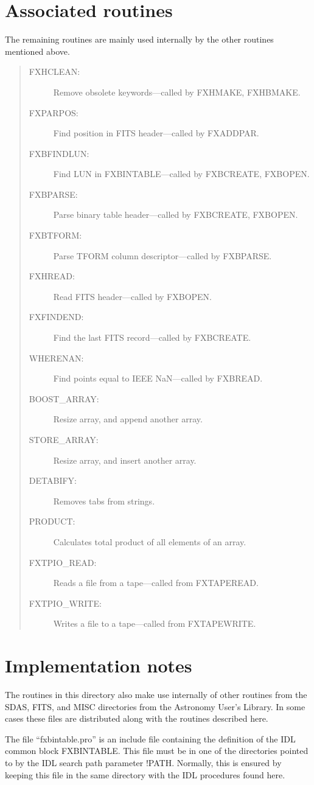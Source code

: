 \section{Associated routines}

The remaining routines are mainly used internally by the other routines
mentioned above.
\begin{quote}
\begin{description}
\item[FXHCLEAN:]
Remove obsolete keywords---called by FXHMAKE, FXHBMAKE.
\item[FXPARPOS:]
Find position in FITS header---called by FXADDPAR.
\item[FXBFINDLUN:]
Find LUN in FXBINTABLE---called by FXBCREATE, FXBOPEN.
\item[FXBPARSE:]
Parse binary table header---called by FXBCREATE, FXBOPEN.
\item[FXBTFORM:]
Parse TFORM column descriptor---called by FXBPARSE.
\item[FXHREAD:]
Read FITS header---called by FXBOPEN.
\item[FXFINDEND:]
Find the last FITS record---called by FXBCREATE.
\item[WHERENAN:]
Find points equal to IEEE NaN---called by FXBREAD.
\item[BOOST\_ARRAY:]
Resize array, and append another array.
\item[STORE\_ARRAY:]
Resize array, and insert another array.
\item[DETABIFY:]
Removes tabs from strings.
\item[PRODUCT:]
Calculates total product of all elements of an array.
\item[FXTPIO\_READ:]
Reads a file from a tape---called from FXTAPEREAD.
\item[FXTPIO\_WRITE:]
Writes a file to a tape---called from FXTAPEWRITE.
\end{description}
\end{quote}

\section{Implementation notes}

The routines in this directory also make use internally of other routines from
the SDAS, FITS, and MISC directories from the Astronomy User's Library.  In
some cases these files are distributed along with the routines described here.

The file ``fxbintable.pro'' is an include file containing the definition of the
IDL common block FXBINTABLE.  This file must be in one of the directories
pointed to by the IDL search path parameter !PATH\@.  Normally, this is ensured
by keeping this file in the same directory with the IDL procedures found here.


